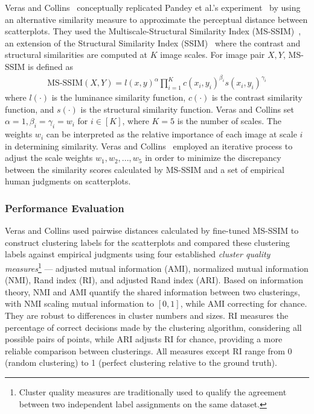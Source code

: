 \documentclass[sigconf]{acmart}
\begin{document}
Veras and Collins~\cite{veras2019discriminability} conceptually replicated Pandey et al.'s experiment~\cite{pandey2016towards} by using an alternative similarity measure to approximate the perceptual distance between scatterplots. They used the Multiscale-Structural Similarity Index (MS-SSIM)~\cite{wang2003multiscale}, an extension of the Structural Similarity Index (SSIM)~\cite{wangImageQualityAssessment2004} where the contrast and structural similarities are computed at $K$ image scales. For image pair $X, Y$, MS-SSIM is defined as 
\begin{align}
    \text{MS-SSIM}(X, Y) = l(x,y)^\alpha \prod_{i=1}^K c(x_i, y_i)^{\beta_i} s(x_i, y_i)^{\gamma_i}
\end{align}
where $l(\cdot)$ is the luminance similarity function, $c(\cdot)$ is the contrast similarity function, and $s(\cdot)$ is the structural similarity function. Veras and Collins set $\alpha = 1, \beta_i = \gamma_i = w_i$ for $i \in [K]$, where $K = 5$ is the number of scales. The weights $w_i$ can be interpreted as the relative importance of each image at scale $i$ in determining similarity. Veras and Collins~\cite{veras2019discriminability} employed an iterative process to adjust the scale weights $w_1, w_2, ..., w_5$ in order to minimize the discrepancy between the similarity scores calculated by MS-SSIM and a set of empirical human judgments on scatterplots. 

\subsubsection{Performance Evaluation}

Veras and Collins used pairwise distances calculated by fine-tuned MS-SSIM to construct clustering labels for the scatterplots and compared these clustering labels against empirical judgments using four established \textit{cluster quality measures}\footnote{Cluster quality measures are traditionally used to qualify the agreement between two independent label assignments on the same dataset.} --- adjusted mutual information (AMI), normalized mutual information (NMI), Rand index (RI), and adjusted Rand index (ARI). Based on information theory, NMI and AMI quantify the shared information between two clusterings, with NMI scaling mutual information to $[0,1]$, while AMI correcting for chance. They are robust to differences in cluster numbers and sizes. RI measures the percentage of correct decisions made by the clustering algorithm, considering all possible pairs of points, while ARI adjusts RI for chance, providing a more reliable comparison between clusterings. All measures except RI range from 0 (random clustering) to 1 (perfect clustering relative to the ground truth).
\end{document}

